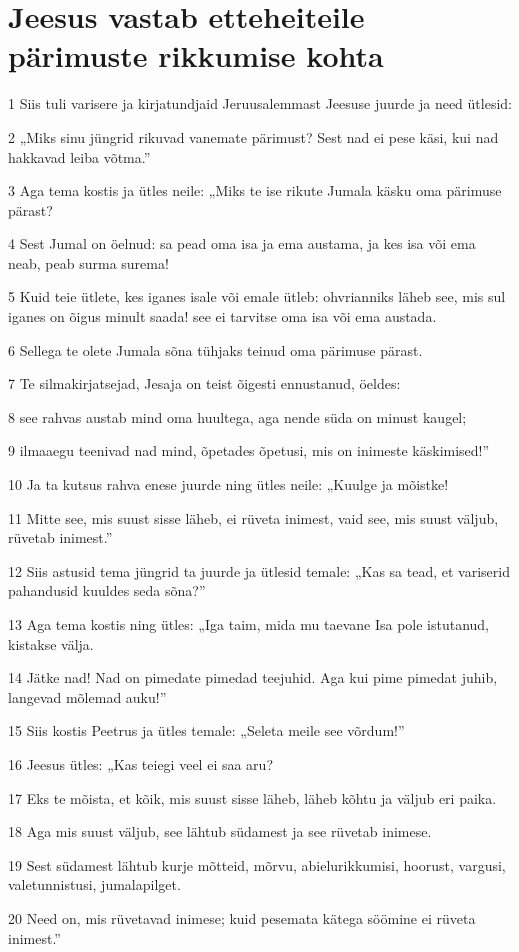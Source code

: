 \section*{Jeesus vastab etteheiteile pärimuste rikkumise kohta}

\par 1 Siis tuli varisere ja kirjatundjaid Jeruusalemmast Jeesuse juurde ja need ütlesid:
\par 2 „Miks sinu jüngrid rikuvad vanemate pärimust? Sest nad ei pese käsi, kui nad hakkavad leiba võtma.”
\par 3 Aga tema kostis ja ütles neile: „Miks te ise rikute Jumala käsku oma pärimuse pärast?
\par 4 Sest Jumal on öelnud: sa pead oma isa ja ema austama, ja kes isa või ema neab, peab surma surema!
\par 5 Kuid teie ütlete, kes iganes isale või emale ütleb: ohvrianniks läheb see, mis sul iganes on õigus minult saada! see ei tarvitse oma isa või ema austada.
\par 6 Sellega te olete Jumala sõna tühjaks teinud oma pärimuse pärast.
\par 7 Te silmakirjatsejad, Jesaja on teist õigesti ennustanud, öeldes:
\par 8 see rahvas austab mind oma huultega, aga nende süda on minust kaugel;
\par 9 ilmaaegu teenivad nad mind, õpetades õpetusi, mis on inimeste käskimised!”
\par 10 Ja ta kutsus rahva enese juurde ning ütles neile: „Kuulge ja mõistke!
\par 11 Mitte see, mis suust sisse läheb, ei rüveta inimest, vaid see, mis suust väljub, rüvetab inimest.”
\par 12 Siis astusid tema jüngrid ta juurde ja ütlesid temale: „Kas sa tead, et variserid pahandusid kuuldes seda sõna?”
\par 13 Aga tema kostis ning ütles: „Iga taim, mida mu taevane Isa pole istutanud, kistakse välja.
\par 14 Jätke nad! Nad on pimedate pimedad teejuhid. Aga kui pime pimedat juhib, langevad mõlemad auku!”
\par 15 Siis kostis Peetrus ja ütles temale: „Seleta meile see võrdum!”
\par 16 Jeesus ütles: „Kas teiegi veel ei saa aru?
\par 17 Eks te mõista, et kõik, mis suust sisse läheb, läheb kõhtu ja väljub eri paika.
\par 18 Aga mis suust väljub, see lähtub südamest ja see rüvetab inimese.
\par 19 Sest südamest lähtub kurje mõtteid, mõrvu, abielurikkumisi, hoorust, vargusi, valetunnistusi, jumalapilget.
\par 20 Need on, mis rüvetavad inimese; kuid pesemata kätega söömine ei rüveta inimest.”

